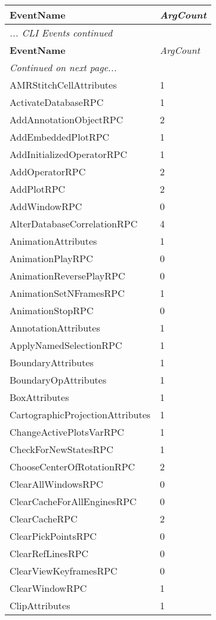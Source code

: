 \documentclass[10pt,a4paper]{report}
\begin{document}
\begin{longtable}{ll}
{\bf EventName} & {\it ArgCount } \\
\hline \hline
\endfirsthead
\multicolumn{2}{l}{{\it ... CLI Events continued }} \\
{\bf EventName} & {\it ArgCount } \\
\hline \hline
\endhead
\multicolumn{2}{l}{{\it Continued on next page...}} \\
\endfoot
\hline
\endlastfoot

AMRStitchCellAttributes & 1 \\
ActivateDatabaseRPC & 1 \\
AddAnnotationObjectRPC & 2 \\
AddEmbeddedPlotRPC & 1 \\
AddInitializedOperatorRPC & 1 \\
AddOperatorRPC & 2 \\
AddPlotRPC & 2 \\
AddWindowRPC & 0 \\
AlterDatabaseCorrelationRPC & 4 \\
AnimationAttributes & 1 \\
AnimationPlayRPC & 0 \\
AnimationReversePlayRPC & 0 \\
AnimationSetNFramesRPC & 1 \\
AnimationStopRPC & 0 \\
AnnotationAttributes & 1 \\
ApplyNamedSelectionRPC & 1 \\
BoundaryAttributes & 1 \\
BoundaryOpAttributes & 1 \\
BoxAttributes & 1 \\
CartographicProjectionAttributes & 1 \\
ChangeActivePlotsVarRPC & 1 \\
CheckForNewStatesRPC & 1 \\
ChooseCenterOfRotationRPC & 2 \\
ClearAllWindowsRPC & 0 \\
ClearCacheForAllEnginesRPC & 0 \\
ClearCacheRPC & 2 \\
ClearPickPointsRPC & 0 \\
ClearRefLinesRPC & 0 \\
ClearViewKeyframesRPC & 0 \\
ClearWindowRPC & 1 \\
ClipAttributes & 1 \\

\end{longtable}
\end{document}
